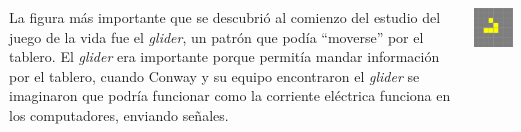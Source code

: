 \documentclass[20pt,margin=2.2cm,innermargin=-4.5in,blockverticalspace=-0.25in]{tikzposter}
\begin{document}
\begin{columns}
{        \vspace{3mm}
        La figura más importante que se descubri\'o al comienzo del estudio del juego de la vida fue el \textit{glider}, un patr\'on que pod\'ia ``moverse'' por el tablero. El \textit{glider} era importante porque permit\'ia mandar informaci\'on por el tablero, cuando Conway y su equipo encontraron el \textit{glider} se imaginaron que podr\'ia funcionar como la corriente el\'ectrica funciona en los computadores, enviando se\~nales.
        \vspace{7mm}

        \begin{minipage}[t]{\linewidth}
            \centering
            \begin{minipage}[t]{0.15\linewidth}
                \includegraphics[width=\textwidth]{images/life-glider-1.png}
            \end{minipage}
            \begin{minipage}[t]{0.15\linewidth}

\end{minipage}
\end{minipage}}
\end{columns}
\end{document}

